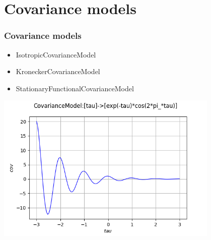 \documentclass{beamer}
\begin{document}





\section{Covariance models}


\begin{frame}
\frametitle{Covariance models}


\begin{itemize}
\item IsotropicCovarianceModel
\item KroneckerCovarianceModel
\item StationaryFunctionalCovarianceModel
\end{itemize}

% 
\begin{center}
\includegraphics[width=0.8\textwidth]{figures/funccovmodel.png}
\end{center}

\end{frame}
\end{document}
